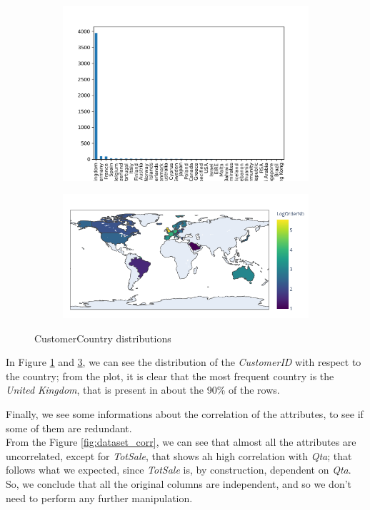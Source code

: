 \begin{figure}[!h]
\begin{subfigure}{.49\textwidth}
\centering
\includegraphics[width=.93\textwidth]{img/understanding/orders_country_bar.png}
\caption{}
\label{fig:orders_country_bar}
\end{subfigure}
\begin{subfigure}{.49\textwidth}
\centering
\includegraphics[width=.93\textwidth]{img/understanding/orders_country.png}
\caption{}
\label{fig:orders_country}
\end{subfigure}
\caption{CustomerCountry distributions}
\end{figure}

In Figure \ref{fig:orders_country_bar} and \ref{fig:orders_country}, we can see the distribution of the \emph{CustomerID} with respect to the country; from the plot, it is clear that the most frequent country is the \emph{United Kingdom}, that is present in about the 90\% of the rows.

Finally, we see some informations about the correlation of the attributes, to see if some of them are redundant.\\
From the Figure \ref{fig:dataset_corr}, we can see that almost all the attributes are uncorrelated, except for \emph{TotSale}, that shows ah high correlation with \emph{Qta}; that follows what we expected, since \emph{TotSale} is, by construction, dependent on \emph{Qta}. So, we conclude that all the original columns are independent, and so we don't need to perform any further manipulation.

